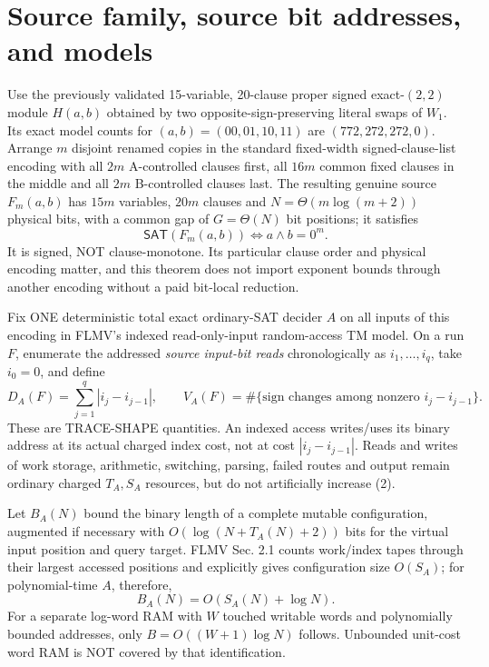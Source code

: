 \documentclass[11pt]{article}
\newcommand{\SAT}{\mathsf{SAT}}
\begin{document}
\section{Source family, source bit addresses, and models}
Use the previously validated 15-variable, 20-clause proper signed exact-$(2,2)$ module $H(a,b)$ obtained by two opposite-sign-preserving literal swaps of $W_1$. Its exact model counts for $(a,b)=(00,01,10,11)$ are $(772,272,272,0)$. Arrange $m$ disjoint renamed copies in the standard fixed-width signed-clause-list encoding with all $2m$ A-controlled clauses first, all $16m$ common fixed clauses in the middle and all $2m$ B-controlled clauses last. The resulting genuine source $F_m(a,b)$ has $15m$ variables, $20m$ clauses and $N=\Theta(m\log(m+2))$ physical bits, with a common gap of $G=\Theta(N)$ bit positions; it satisfies
\[
 \SAT(F_m(a,b))\iff a\wedge b=0^m. \tag{1}
\]
It is signed, NOT clause-monotone. Its particular clause order and physical encoding matter, and this theorem does not import exponent bounds through another encoding without a paid bit-local reduction.

Fix ONE deterministic total exact ordinary-SAT decider $A$ on all inputs of this encoding in FLMV's indexed read-only-input random-access TM model. On a run $F$, enumerate the addressed \emph{source input-bit reads} chronologically as $i_1,\ldots,i_q$, take $i_0=0$, and define
\[
 D_A(F)=\sum_{j=1}^{q}|i_j-i_{j-1}|,\qquad
 V_A(F)=\#\{\text{sign changes among nonzero }i_j-i_{j-1}\}. \tag{2}
\]
These are TRACE-SHAPE quantities. An indexed access writes/uses its binary address at its actual charged index cost, not at cost $|i_j-i_{j-1}|$. Reads and writes of work storage, arithmetic, switching, parsing, failed routes and output remain ordinary charged $T_A,S_A$ resources, but do not artificially increase (2).

Let $B_A(N)$ bound the binary length of a complete mutable configuration, augmented if necessary with $O(\log(N+T_A(N)+2))$ bits for the virtual input position and query target. FLMV Sec. 2.1 counts work/index tapes through their largest accessed positions and explicitly gives configuration size $O(S_A)$; for polynomial-time $A$, therefore,
\[
 B_A(N)=O(S_A(N)+\log N). \tag{3}
\]
For a separate log-word RAM with $W$ touched writable words and polynomially bounded addresses, only $B=O((W+1)\log N)$ follows. Unbounded unit-cost word RAM is NOT covered by that identification.
\end{document}
